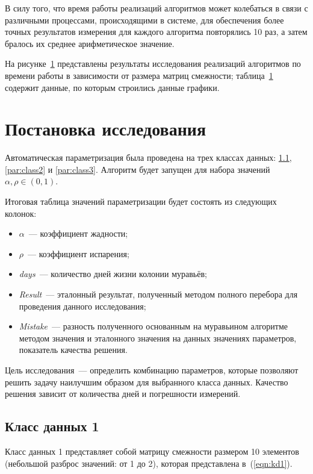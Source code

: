 В силу того, что время работы реализаций алгоритмов может колебаться в связи с различными процессами, происходящими в системе, для обеспечения более точных результатов измерения для каждого алгоритма повторялись 10 раз, а затем бралось их среднее арифметическое значение.

На рисунке~\ref{} представлены результаты исследования реализаций алгоритмов по времени работы в зависимости от размера матриц смежности; таблица~\ref{} содержит данные, по которым строились данные графики.

\section{Постановка исследования}

Автоматическая параметризация была проведена на трех классах данных: \ref{par:class1}, \ref{par:class2} и \ref{par:class3}.
Алгоритм будет запущен для набора значений $\alpha, \rho \in (0, 1)$.

Итоговая таблица значений параметризации будет состоять из следующих колонок:
\begin{itemize}
	\item $\alpha$~--- коэффициент жадности;
	\item $\rho$~--- коэффициент испарения;
	\item \textit{days}~--- количество дней жизни колонии муравьёв;
	\item \textit{Result}~--- эталонный результат, полученный методом полного перебора для проведения данного исследования;
	\item \textit{Mistake}~--- разность полученного основанным на муравьином алгоритме методом значения и эталонного значения на данных значениях параметров, показатель качества решения.
\end{itemize}

Цель исследования~--- определить комбинацию параметров, которые позволяют решить задачу наилучшим образом для выбранного класса данных.
Качество решения зависит от количества дней и погрешности измерений.

\subsection{Класс данных 1}
\label{par:class1}

Класс данных 1 представляет собой матрицу смежности размером 10 элементов (небольшой разброс значений: от 1 до 2), которая представлена в~(\ref{eqn:kd1}).

